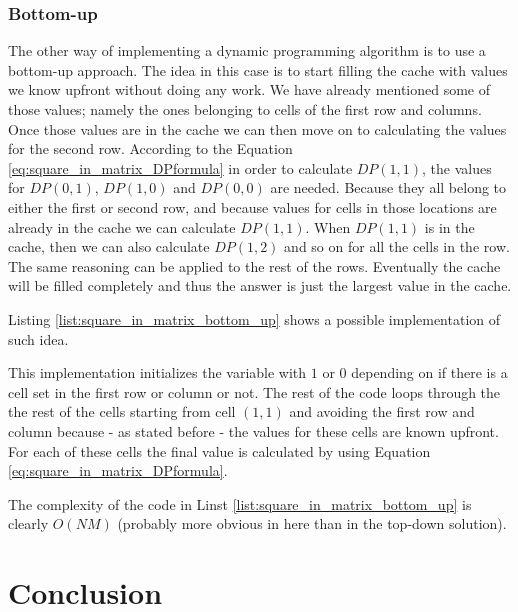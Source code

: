 \subsubsection{Bottom-up}
\label{sec:square_in_matrix:bottom-up}
The other way of implementing a dynamic programming algorithm is to use a
bottom-up approach. The idea in this case is to start filling the cache with
values we know upfront without doing any work. We have already mentioned some of
those values; namely the ones belonging to cells of the first row and columns.
Once those values are in the cache we can then move on to calculating the values
for the second row. According to the Equation \ref{eq:square_in_matrix_DPformula} in order to calculate
$DP(1,1)$, the values for $DP(0,1)$, $DP(1,0)$ and $DP(0,0)$ are needed. Because
they all belong to either the first or second row, and because values for cells
in those locations are already in the cache we can calculate $DP(1,1)$. When
$DP(1,1)$ is in the cache, then we can also calculate $DP(1,2)$ and so on for
all the cells in the row. The same reasoning can be applied to the rest of the
rows. Eventually the cache will be filled completely and thus the answer is just
the largest value in the cache. 

Listing \ref{list:square_in_matrix_bottom_up} shows a possible implementation of
such idea.

This implementation initializes the  variable with $1$ or $0$
depending on if there is a cell set in the first row or column or not. The rest of
the code loops through the the rest of the cells starting from cell $(1,1)$ and
avoiding the first row and column because  - as stated before  - the values for these
cells are known upfront. For each of these cells the final value is calculated
by using Equation \ref{eq:square_in_matrix_DPformula}. 

The complexity of the code in Linst \ref{list:square_in_matrix_bottom_up} is
clearly $O(NM)$ (probably more obvious in here than in the top-down solution). 


\section{Conclusion}




